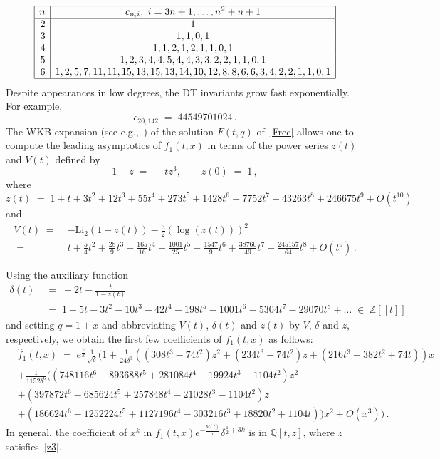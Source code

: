 \documentclass[12pt,reqno]{amsart}
\theoremstyle{definition}
\def\BZ{\mathbb Z}
\def\BQ{\mathbb Q}
\def\Li{\mathrm{Li}}
\def\be{\begin{equation}}
\def\ee{\end{equation}}
\def\={\;=\;}
\def\inn{\;\in\;}
\def\Phitof{f}
\begin{document}
\be
\label{DTvalues}
\begin{array}{|r|c|} \hline
  n &  c_{n,i}, \,\, i=3n+1,\dots,n^2+n+1 \\ \hline
  2 & 1 \\ %
  3 & 1, 1, 0, 1 \\ %
  4 & 1, 1, 2, 1, 2, 1, 1, 0, 1 \\ %
  5 & 1, 2, 3, 4, 4, 5, 4, 4, 3, 3, 2, 2, 1, 1, 0, 1 \\ %
  6 & 1, 2, 5, 7, 11, 11, 15, 13, 15, 13, 14, 10, 12, 8, 8, 6, 6, 3, 4, 2, 
2, 1, 1, 0, 1 \\ \hline
\end{array}
\ee
Despite appearances in low degrees, the DT invariants grow fast exponentially.
For example,
\be
c_{20,142} \= 44549701024 \,. 
\ee
The WKB expansion (see e.g.,~\cite{Bender}) of the solution $F(t,q)$
of~\eqref{Frec} allows one to compute the leading asymptotics of $\Phitof_1(t,x)$
in terms of the power series $z(t)$ and $V(t)$ defined by
\be
\label{z3}
1 - z  \= - t z^3, \qquad z(0)\=1\,,
\ee
where
\be
\label{zfew3}
z(t) \= 1 + t + 3 t^2 + 12 t^3 + 55 t^4 + 273 t^5 + 1428 t^6 + 7752 t^7 + 
 43263 t^8 + 246675 t^9 + O(t^{10}) %
\ee
and
\be
\label{V3}
\begin{aligned}
V(t) \= & -\Li_2(1-z(t)) -\frac{3}{2} (\log(z(t)))^2
\\
\= & t + \frac{5}{4} t^2 + \frac{28}{9} t^3 + \frac{165}{16} t^4 + \frac{1001}{25} t^5
+ \frac{1547}{9} t^6 + \frac{38760}{49} t^7 + \frac{245157}{64} t^8
+ O(t^9) \,. %
\end{aligned}
\ee


Using the auxiliary function 
\be
\label{delta3}
\begin{aligned}
\delta(t) & \=  -2t-\frac{t}{1-z(t)} \\
& \=1 - 5 t - 3 t^2 - 10 t^3 - 42 t^4 - 198 t^5 - 1001 t^6
- 5304 t^7 - 29070 t^8 + \dots %
\inn \BZ[\![t]\!]
\end{aligned}
\ee
and setting $q=1+x$ and abbreviating $V(t)$, $\delta(t)$ and $z(t)$ by $V$, $\delta$
and $z$, respectively, we obtain the first few coefficients of $\Phitof_1(t,x)$ as
follows:
\be
\label{Phi1tx3}
\begin{aligned}
&\widehat{\Phitof}_1(t,x) \= e^{\tfrac{V}{x}} \frac{1}{\sqrt{\delta}} \Big(1 +
\frac{1}{24 \delta^3}
((308 t^3 - 74 t^2) z^2 + (234 t^3 - 74 t^2) z + (216 t^3 - 382 t^2 + 74 t)) x
\\
&
+\frac{1}{1152\delta^6}(
(748116 t^6 - 893688 t^5 + 281084 t^4 - 19924 t^3 - 1104 t^2) z^2
\\ &  + (397872 t^6 - 685624 t^5 + 257848 t^4 - 21028 t^3 - 1104 t^2) z
\\ &  + (186624 t^6 - 1252224 t^5 + 1127196 t^4 - 303216 t^3 + 18820 t^2 + 1104 t))
  x^2 + O(x^3) \Big) \,.
\end{aligned}
\ee
In general, the coefficient of $x^k$ in $\Phitof_1(t,x) e^{-\tfrac{V(t)}{x}}
\delta^{\frac{1}{2} + 3k}$ is in $\BQ[t,z]$, where $z$ satisfies~\eqref{z3}.
\end{document}
